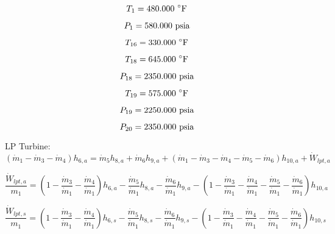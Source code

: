 \documentclass{article}
\begin{document}
\begin{equation}
T_{ 1} =  480.000\textnormal{ \(^{\circ}\)F             }
\end{equation}

\begin{equation}
P_{ 1} =  580.000\textnormal{ psia                      }
\end{equation}

\begin{equation}
T_{16} =  330.000\textnormal{ \(^{\circ}\)F             }
\end{equation}

\begin{equation}
T_{18} =  645.000\textnormal{ \(^{\circ}\)F             }
\end{equation}

\begin{equation}
P_{18} = 2350.000\textnormal{ psia                      }
\end{equation}

\begin{equation}
T_{19} =  575.000\textnormal{ \(^{\circ}\)F             }
\end{equation}

\begin{equation}
P_{19} = 2250.000\textnormal{ psia                      }
\end{equation}

\begin{equation}
P_{20} = 2350.000\textnormal{ psia                      }
\end{equation}


LP Turbine:
\begin{equation}
(\dot{m}_{ 1} - \dot{m}_{ 3} - \dot{m}_{ 4})h_{ 6,a} = \dot{m}_{ 5}h_{ 8,a} + \dot{m}_{ 6}h_{ 9,a} + (\dot{m}_{ 1} - \dot{m}_{ 3} - \dot{m}_{ 4} - \dot{m}_{ 5} - \dot{m}_{ 6})h_{10,a} + \dot{W}_{lpt,a}
\end{equation}

\begin{equation}
\frac{\dot{W}_{lpt,a}}{m_1} = (1 - \frac{\dot{m}_{ 3}}{\dot{m}_{ 1}} - \frac{\dot{m}_{ 4}}{\dot{m}_{ 1}})h_{ 6,a} - \frac{\dot{m}_{ 5}}{\dot{m}_{ 1}}h_{ 8,a} - \frac{\dot{m}_{ 6}}{\dot{m}_{ 1}}h_{ 9,a} - (1 - \frac{\dot{m}_{ 3}}{\dot{m}_{ 1}} - \frac{\dot{m}_{ 4}}{\dot{m}_{ 1}} - \frac{\dot{m}_{ 5}}{\dot{m}_{ 1}} - \frac{\dot{m}_{ 6}}{\dot{m}_{ 1}})h_{10,a}\end{equation}

\begin{equation}
\frac{\dot{W}_{lpt,s}}{m_1} = (1 - \frac{\dot{m}_{ 3}}{\dot{m}_{ 1}} - \frac{\dot{m}_{ 4}}{\dot{m}_{ 1}})h_{ 6,s} - \frac{\dot{m}_{ 5}}{\dot{m}_{ 1}}h_{ 8,s} - \frac{\dot{m}_{ 6}}{\dot{m}_{ 1}}h_{ 9,s} - (1 - \frac{\dot{m}_{ 3}}{\dot{m}_{ 1}} - \frac{\dot{m}_{ 4}}{\dot{m}_{ 1}} - \frac{\dot{m}_{ 5}}{\dot{m}_{ 1}} - \frac{\dot{m}_{ 6}}{\dot{m}_{ 1}})h_{10,s}\end{equation}
\end{document}
